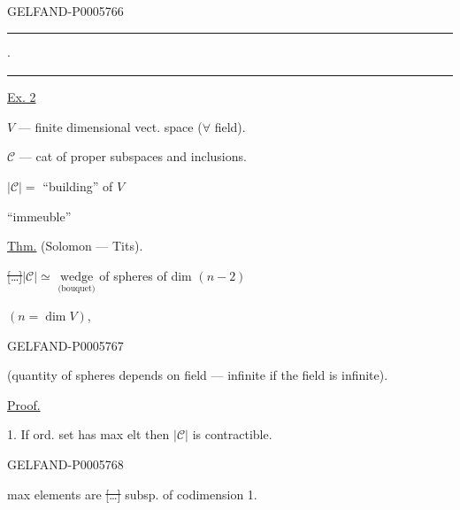 \begin{GelfandAdjacentEvidence}{GELFAND-P000576}{6}


\noindent\hfill\rule{1.18cm}{.32pt}\enspace\(\cdot\)\enspace\rule{1.22cm}{.32pt}\par

\underline{Ex. 2}

\(V\) — finite dimensional vect. space (\(\forall\) field).

\(\mathcal C\) — cat of proper subspaces and inclusions.

\(\lvert\mathcal C\rvert=\) “building” of \(V\)
\hfill{}

\hspace{5em}“immeuble”

\underline{Thm.} (Solomon — Tits).

\sout{[\ldots]}\quad \(\lvert\mathcal C\rvert\simeq\)
\(\underset{\text{(bouquet)}}{\text{wedge}}\)
of spheres of dim \((n-2)\)

\hfill\((n=\dim V)\),
\end{GelfandAdjacentEvidence}
\begin{GelfandAdjacentEvidence}{GELFAND-P000576}{7}


(quantity of spheres depends on field — infinite if the field is infinite).

\underline{Proof.}

1. If ord. set has max elt then \(\lvert\mathcal C\rvert\) is contractible.
\end{GelfandAdjacentEvidence}
\begin{GelfandAdjacentEvidence}{GELFAND-P000576}{8}


max elements are \sout{[\ldots]} subsp. of codimension 1.
\end{GelfandAdjacentEvidence}
